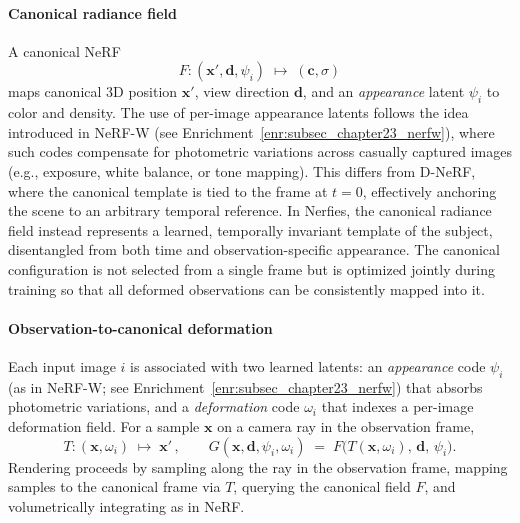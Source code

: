 \begin{enrichment}
\begin{enrichment}
        \paragraph{Canonical radiance field}
        A canonical NeRF
        \[
        F:(\mathbf{x}',\mathbf{d},\psi_i)\;\mapsto\;(\mathbf{c},\sigma)
        \]
        maps canonical 3D position \(\mathbf{x}'\), view direction \(\mathbf{d}\), and an \emph{appearance} latent \(\psi_i\) to color and density. The use of per-image appearance latents follows the idea introduced in NeRF-W (see Enrichment~\ref{enr:subsec_chapter23_nerfw}), where such codes compensate for photometric variations across casually captured images (e.g., exposure, white balance, or tone mapping). This differs from D-NeRF, where the canonical template is tied to the frame at \(t{=}0\), effectively anchoring the scene to an arbitrary temporal reference. In Nerfies, the canonical radiance field instead represents a learned, temporally invariant template of the subject, disentangled from both time and observation-specific appearance. The canonical configuration is not selected from a single frame but is optimized jointly during training so that all deformed observations can be consistently mapped into it.
        
        \paragraph{Observation-to-canonical deformation}
        Each input image \(i\) is associated with two learned latents: an \emph{appearance} code \(\psi_i\) (as in NeRF-W; see Enrichment~\ref{enr:subsec_chapter23_nerfw}) that absorbs photometric variations, and a \emph{deformation} code \(\omega_i\) that indexes a per-image deformation field. For a sample \(\mathbf{x}\) on a camera ray in the observation frame,
        \[
        T:(\mathbf{x},\omega_i)\;\mapsto\;\mathbf{x}' \,, \qquad
        G(\mathbf{x},\mathbf{d},\psi_i,\omega_i) \;=\; F\!\big(T(\mathbf{x},\omega_i),\,\mathbf{d},\,\psi_i\big).
        \]
        Rendering proceeds by sampling along the ray in the observation frame, mapping samples to the canonical frame via \(T\), querying the canonical field \(F\), and volumetrically integrating as in NeRF.
        

\end{enrichment}
\end{enrichment}
